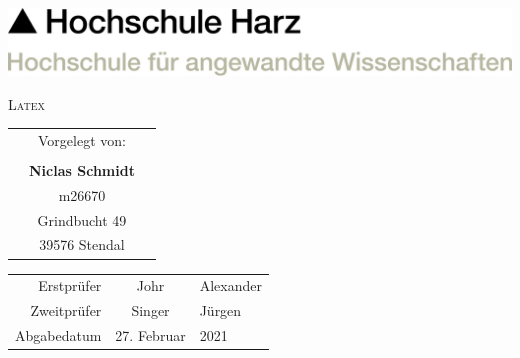 
\begin{center} 
    \includegraphics[width=0.5\paperwidth]{graphics/HSHARZ.png}
    \vspace{20mm}

    \Huge{\textsc{Latex}} 
    \normalsize
    
    \vspace{20mm}
    
    \begin{tabular}{r c l} 
        & Vorgelegt von: & \\
        && \\
        & \textbf{Niclas Schmidt} &\\
        & m26670 & \\
        & Grindbucht 49 & \\
        & 39576 Stendal & \\
             
    \end{tabular}
    
    \vfill
    \begin{tabular}{r c l}
        Erstprüfer & Johr & Alexander \\
        Zweitprüfer & Singer & Jürgen \\
        Abgabedatum & 27. Februar & 2021 \\
    \end{tabular} 
\end{center}